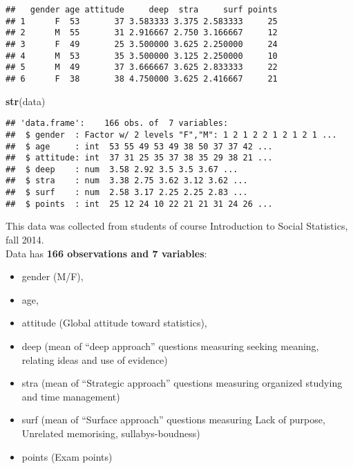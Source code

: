 \documentclass[]{article}
\newenvironment{Shaded}{\begin{snugshade}}{\end{snugshade}}
\newcommand{\KeywordTok}[1]{\textcolor[rgb]{0.13,0.29,0.53}{\textbf{#1}}}
\newcommand{\NormalTok}[1]{#1}
\providecommand{\tightlist}{%
  \setlength{\itemsep}{0pt}\setlength{\parskip}{0pt}}
\begin{document}
\begin{verbatim}
##   gender age attitude     deep  stra     surf points
## 1      F  53       37 3.583333 3.375 2.583333     25
## 2      M  55       31 2.916667 2.750 3.166667     12
## 3      F  49       25 3.500000 3.625 2.250000     24
## 4      M  53       35 3.500000 3.125 2.250000     10
## 5      M  49       37 3.666667 3.625 2.833333     22
## 6      F  38       38 4.750000 3.625 2.416667     21
\end{verbatim}

\begin{Shaded}
\begin{Highlighting}[]
\KeywordTok{str}\NormalTok{(data)}
\end{Highlighting}
\end{Shaded}

\begin{verbatim}
## 'data.frame':    166 obs. of  7 variables:
##  $ gender  : Factor w/ 2 levels "F","M": 1 2 1 2 2 1 2 1 2 1 ...
##  $ age     : int  53 55 49 53 49 38 50 37 37 42 ...
##  $ attitude: int  37 31 25 35 37 38 35 29 38 21 ...
##  $ deep    : num  3.58 2.92 3.5 3.5 3.67 ...
##  $ stra    : num  3.38 2.75 3.62 3.12 3.62 ...
##  $ surf    : num  2.58 3.17 2.25 2.25 2.83 ...
##  $ points  : int  25 12 24 10 22 21 21 31 24 26 ...
\end{verbatim}

This data was collected from students of course Introduction to Social
Statistics, fall 2014.\\
Data has \textbf{166 observations and 7 variables}:

\begin{itemize}
\tightlist
\item
  gender (M/F),\\
\item
  age,\\
\item
  attitude (Global attitude toward statistics),
\item
  deep (mean of ``deep approach'' questions measuring seeking meaning,
  relating ideas and use of evidence)
\item
  stra (mean of ``Strategic approach'' questions measuring organized
  studying and time management)
\item
  surf (mean of ``Surface approach'' questions measuring Lack of
  purpose, Unrelated memorising, sullabys-boudness)
\item
  points (Exam points)
\end{itemize}
\end{document}
